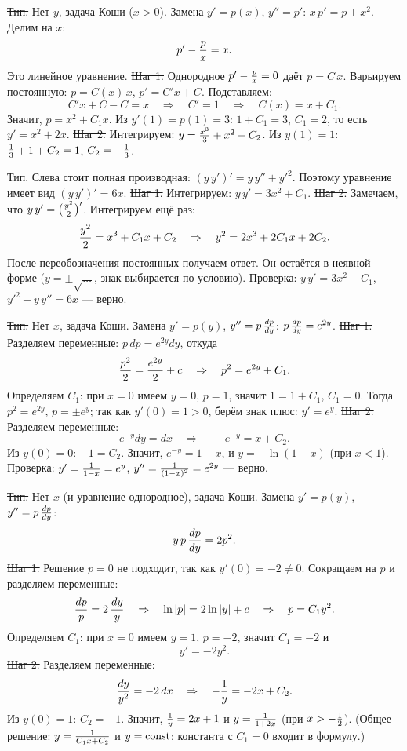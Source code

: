 \st{Тип.} Нет $y$, задача Коши ($x>0$). Замена $y'=p(x)$, $y''=p'$:
$x\,p'=p+x^2$. Делим на $x$:
$$p'-{p\over x}=x.$$
Это линейное уравнение.
\st{Шаг 1.} Однородное $p'-{p\over x}=0$ даёт $p=C\,x$. Варьируем
постоянную: $p=C(x)\,x$, $p'=C'x+C$. Подставляем:
$$C'x+C-C=x\quad\Rightarrow\quad C'=1\quad\Rightarrow\quad C(x)=x+C_1.$$
Значит, $p=x^2+C_1x$. Из $y'(1)=p(1)=3$: $1+C_1=3$, $C_1=2$, то есть
$y'=x^2+2x$.
\st{Шаг 2.} Интегрируем: $y={x^3\over3}+x^2+C_2$. Из $y(1)=1$:
${1\over3}+1+C_2=1$, $C_2=-{1\over3}$.

\st{Тип.} Слева стоит полная производная: $(y\,y')'=y\,y''+y'^2$. Поэтому
уравнение имеет вид $(y\,y')'=6x$.
\st{Шаг 1.} Интегрируем: $y\,y'=3x^2+C_1$.
\st{Шаг 2.} Замечаем, что $y\,y'=\bigl({y^2\over2}\bigr)'$. Интегрируем ещё раз:
$${y^2\over2}=x^3+C_1x+C_2\quad\Rightarrow\quad y^2=2x^3+2C_1x+2C_2.$$
После переобозначения постоянных получаем ответ. Он остаётся в неявной
форме ($y=\pm\sqrt{\ldots}$, знак выбирается по условию).
\smallskip
Проверка: $y\,y'=3x^2+C_1$, $y'^2+y\,y''=6x$ --- верно.

\st{Тип.} Нет $x$, задача Коши. Замена $y'=p(y)$, $y''=p\,{dp\over dy}$:
$p\,{dp\over dy}=e^{2y}$.
\st{Шаг 1.} Разделяем переменные: $p\,dp=e^{2y}dy$, откуда
$${p^2\over2}={e^{2y}\over2}+c\quad\Rightarrow\quad p^2=e^{2y}+C_1.$$
Определяем $C_1$: при $x=0$ имеем $y=0$, $p=1$, значит $1=1+C_1$, $C_1=0$.
Тогда $p^2=e^{2y}$, $p=\pm e^{y}$; так как $y'(0)=1>0$, берём знак плюс:
$y'=e^{y}$.
\st{Шаг 2.} Разделяем переменные:
$$e^{-y}dy=dx\quad\Rightarrow\quad-e^{-y}=x+C_2.$$
Из $y(0)=0$: $-1=C_2$. Значит, $e^{-y}=1-x$, и
$y=-\ln(1-x)$ (при $x<1$).
\smallskip
Проверка: $y'={1\over1-x}=e^{y}$, $y''={1\over(1-x)^2}=e^{2y}$ --- верно.

\st{Тип.} Нет $x$ (и уравнение однородное), задача Коши. Замена $y'=p(y)$,
$y''=p\,{dp\over dy}$:
$$y\,p\,{dp\over dy}=2p^2.$$
\st{Шаг 1.} Решение $p=0$ не подходит, так как $y'(0)=-2\ne0$. Сокращаем
на $p$ и разделяем переменные:
$${dp\over p}=2\,{dy\over y}\quad\Rightarrow\quad\ln|p|=2\ln|y|+c
\quad\Rightarrow\quad p=C_1y^2.$$
Определяем $C_1$: при $x=0$ имеем $y=1$, $p=-2$, значит $C_1=-2$ и
$$y'=-2y^2.$$
\st{Шаг 2.} Разделяем переменные:
$${dy\over y^2}=-2\,dx\quad\Rightarrow\quad-{1\over y}=-2x+C_2.$$
Из $y(0)=1$: $C_2=-1$. Значит, ${1\over y}=2x+1$ и $y={1\over1+2x}$
(при $x>-{1\over2}$).
\smallskip
(Общее решение: $y={1\over C_1x+C_2}$ и $y=\hbox{const}$; константа с
$C_1=0$ входит в формулу.)

